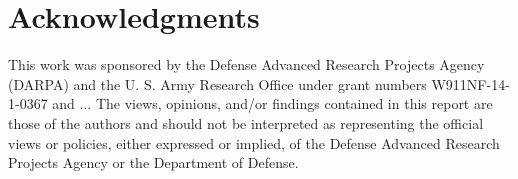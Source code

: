 \section*{Acknowledgments}

This work was sponsored by the Defense Advanced Research Projects
Agency (DARPA) and the U. S. Army Research Office under grant numbers
W911NF-14-1-0367 and ...  The views, opinions, and/or findings
contained in this report are those of the authors and should not be
interpreted as representing the official views or policies, either
expressed or implied, of the Defense Advanced Research Projects Agency
or the Department of Defense.